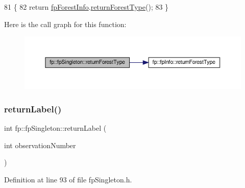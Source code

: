 \begin{DoxyCode}
81                                                 \{
82                 \textcolor{keywordflow}{return} \hyperlink{classfp_1_1fpSingleton_a85965009befa72a749ae498fa5b6ccfa}{fpForestInfo}.\hyperlink{classfp_1_1fpInfo_a97280e7e3cadc5e653d8ef256eb2c82d}{returnForestType}();
83             \}
\end{DoxyCode}
Here is the call graph for this function\+:\nopagebreak
\begin{figure}[H]
\begin{center}
\leavevmode
\includegraphics[width=350pt]{classfp_1_1fpSingleton_af7582b20b48b7eb8c0a6b89fbdf170ab_cgraph}
\end{center}
\end{figure}
\mbox{\label{classfp_1_1fpSingleton_aa2f644b1521948fb994f4087ddfaea14}} 
\subsubsection{\texorpdfstring{return\+Label()}{returnLabel()}}
{\footnotesize\ttfamily int fp\+::fp\+Singleton\+::return\+Label (\begin{DoxyParamCaption}\item[{int}]{observation\+Number }\end{DoxyParamCaption})\hspace{0.3cm}{\ttfamily [inline]}}



Definition at line 93 of file fp\+Singleton.\+h.


